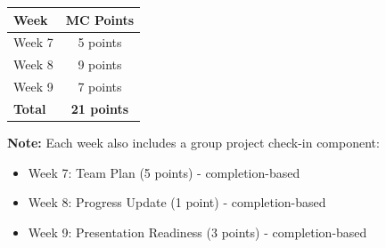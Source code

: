 \documentclass[10pt]{article}
\begin{document}
\begin{center}
\begin{tabular}{lc}
\toprule
\textbf{Week} & \textbf{MC Points} \\
\midrule
Week 7 & 5 points \\
Week 8 & 9 points \\
Week 9 & 7 points \\
\bottomrule
\textbf{Total} & \textbf{21 points} \\
\end{tabular}
\end{center}

\vspace{8pt}

\textbf{Note:} Each week also includes a group project check-in component:
\begin{itemize}[leftmargin=20pt]
\item Week 7: Team Plan (5 points) - completion-based
\item Week 8: Progress Update (1 point) - completion-based
\item Week 9: Presentation Readiness (3 points) - completion-based
\end{itemize}
\end{document}
